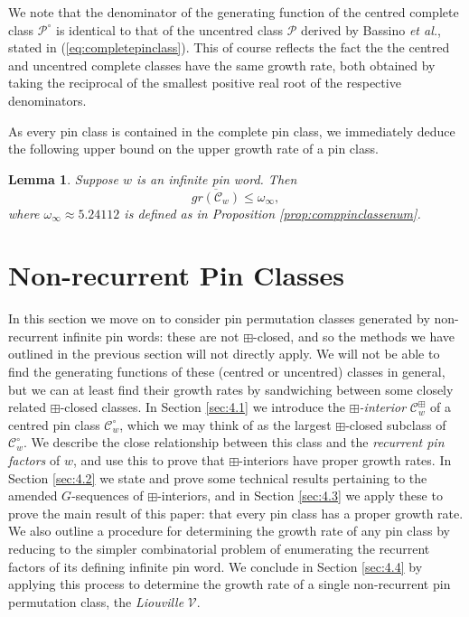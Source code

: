 \documentclass[11pt,a4paper]{article}
\newtheorem{lemma}[thm]{Lemma}
\theoremstyle{definition}
\begin{document}
We note that the denominator of the generating function of the centred complete class $\mathcal{P}^{\circ}$ is identical to that of the uncentred class $\mathcal{P}$ derived by Bassino \emph{et al.}, stated in (\ref{eq:completepinclass}). This of course reflects the fact the the centred and uncentred complete classes have the same growth rate, both obtained by taking the reciprocal of the smallest positive real root of the respective denominators.

As every pin class is contained in the complete pin class, we immediately deduce the following upper bound on the upper growth rate of a pin class.

\begin{lemma} \label{pcupperbound}
Suppose $w$ is an infinite pin word. Then
\[
\overline{gr(\mathcal{C}_{w})} \leq \omega_{\infty},
\]
where $\omega_{\infty} \approx 5.24112$ is defined as in Proposition \ref{prop:comppinclassenum}.
\end{lemma}

\section{Non-recurrent Pin Classes} \label{sec:4}

In this section we move on to consider pin permutation classes generated by non-recurrent infinite pin words: these are not $\boxplus$-closed, and so the methods we have outlined in the previous section will not directly apply. We will not be able to find the generating functions of these (centred or uncentred) classes in general, but we can at least find their growth rates by sandwiching between some closely related $\boxplus$-closed classes. In Section \ref{sec:4.1} we introduce the \emph{$\boxplus$-interior} $\mathcal{C}^{\boxplus}_{w}$ of a centred pin class $\mathcal{C}^{\circ}_{w}$, which we may think of as the largest $\boxplus$-closed subclass of $\mathcal{C}^{\circ}_{w}$. We describe the close relationship between this class and the \emph{recurrent pin factors} of $w$, and use this to prove that $\boxplus$-interiors have proper growth rates. In Section \ref{sec:4.2} we state and prove some technical results pertaining to the amended $G$-sequences of $\boxplus$-interiors, and in Section \ref{sec:4.3} we apply these to prove the main result of this paper: that every pin class has a proper growth rate. We also outline a procedure for determining the growth rate of any pin class by reducing to the simpler combinatorial problem of enumerating the recurrent factors of its defining infinite pin word. We conclude in Section \ref{sec:4.4} by applying this process to determine the growth rate of a single non-recurrent pin permutation class, the \emph{Liouville} $\mathcal{V}$.
\end{document}
